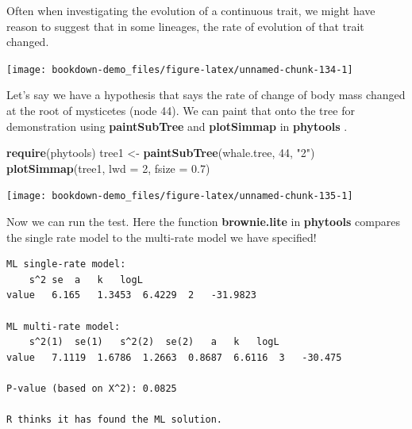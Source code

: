 \documentclass[
]{book}
\newenvironment{Shaded}{\begin{snugshade}}{\end{snugshade}}
\newcommand{\DataTypeTok}[1]{\textcolor[rgb]{0.13,0.29,0.53}{#1}}
\newcommand{\DecValTok}[1]{\textcolor[rgb]{0.00,0.00,0.81}{#1}}
\newcommand{\FloatTok}[1]{\textcolor[rgb]{0.00,0.00,0.81}{#1}}
\newcommand{\KeywordTok}[1]{\textcolor[rgb]{0.13,0.29,0.53}{\textbf{#1}}}
\newcommand{\NormalTok}[1]{#1}
\newcommand{\OperatorTok}[1]{\textcolor[rgb]{0.81,0.36,0.00}{\textbf{#1}}}
\newcommand{\StringTok}[1]{\textcolor[rgb]{0.31,0.60,0.02}{#1}}
\begin{document}
Often when investigating the evolution of a continuous trait, we might have reason to suggest that in some lineages, the rate of evolution of that trait changed.

\begin{center}\texttt{[image: bookdown-demo\_files/figure-latex/unnamed-chunk-134-1]} \end{center}

Let's say we have a hypothesis that says the rate of change of body mass changed at the root of mysticetes (node 44). We can paint that onto the tree for demonstration using \textbf{paintSubTree} and \textbf{plotSimmap} in \textbf{phytools} \citep{phytools}.

\begin{Shaded}
\begin{Highlighting}[]
\KeywordTok{require}\NormalTok{(phytools)}
\NormalTok{tree1 \textless{}{-}}\StringTok{ }\KeywordTok{paintSubTree}\NormalTok{(whale.tree, }\DecValTok{44}\NormalTok{, }\StringTok{"2"}\NormalTok{)}
\KeywordTok{plotSimmap}\NormalTok{(tree1, }\DataTypeTok{lwd =} \DecValTok{2}\NormalTok{, }\DataTypeTok{fsize =} \FloatTok{0.7}\NormalTok{)}
\end{Highlighting}
\end{Shaded}

\begin{center}\texttt{[image: bookdown-demo\_files/figure-latex/unnamed-chunk-135-1]} \end{center}

Now we can run the test. Here the function \textbf{brownie.lite} in \textbf{phytools} compares the single rate model to the multi-rate model we have specified!

\begin{Shaded}
\end{Shaded}

\begin{verbatim}
ML single-rate model:
    s^2 se  a   k   logL
value   6.165   1.3453  6.4229  2   -31.9823    

ML multi-rate model:
    s^2(1)  se(1)   s^2(2)  se(2)   a   k   logL    
value   7.1119  1.6786  1.2663  0.8687  6.6116  3   -30.475

P-value (based on X^2): 0.0825 

R thinks it has found the ML solution.
\end{verbatim}
\end{document}
